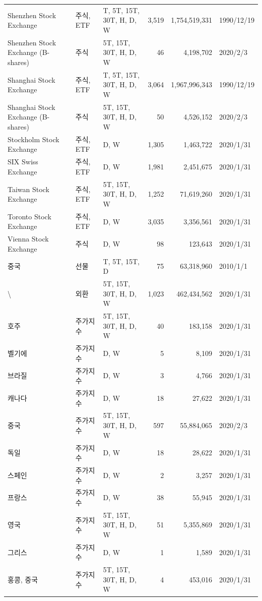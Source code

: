 \begin{footnotesize}
\begin{center}
\begin{longtable}{@{\extracolsep{\fill}} l l l r r l @{}}
        Shenzhen Stock Exchange & 주식, ETF & T, 5T, 15T, 30T, H, D, W & 3,519 & 1,754,519,331 & 1990/12/19 \\
        Shenzhen Stock Exchange (B-shares) & 주식 & 5T, 15T, 30T, H, D, W & 46 & 4,198,702 & 2020/2/3 \\
        Shanghai Stock Exchange & 주식, ETF & T, 5T, 15T, 30T, H, D, W & 3,064 & 1,967,996,343 & 1990/12/19 \\
        Shanghai Stock Exchange (B-shares) & 주식 & 5T, 15T, 30T, H, D, W & 50 & 4,526,152 & 2020/2/3 \\
        Stockholm Stock Exchange & 주식, ETF & D, W  & 1,305 & 1,463,722 & 2020/1/31 \\
        SIX Swiss Exchange & 주식, ETF & D, W  & 1,981 & 2,451,675 & 2020/1/31 \\
        Taiwan Stock Exchange & 주식, ETF & 5T, 15T, 30T, H, D, W & 1,252 & 71,619,260 & 2020/1/31 \\
        Toronto Stock Exchange & 주식, ETF & D, W  & 3,035 & 3,356,561 & 2020/1/31 \\
        Vienna Stock Exchange & 주식 & D, W  & 98 & 123,643 & 2020/1/31 \\
        중국 & 선물 & T, 5T, 15T, D & 75 & 63,318,960 & 2010/1/1 \\
        \textbackslash & 외환 & 5T, 15T, 30T, H, D, W & 1,023 & 462,434,562 & 2020/1/31 \\
        호주 & 주가지수 & 5T, 15T, 30T, H, D, W & 40 & 183,158 & 2020/1/31 \\
        벨기에 & 주가지수 & D, W  & 5 & 8,109 & 2020/1/31 \\
        브라질 & 주가지수 & D, W  & 3 & 4,766 & 2020/1/31 \\
        캐나다 & 주가지수 & D, W  & 18 & 27,622 & 2020/1/31 \\
        중국 & 주가지수 & 5T, 15T, 30T, H, D, W & 597 & 55,884,065 & 2020/2/3 \\
        독일 & 주가지수 & D, W  & 18 & 28,622 & 2020/1/31 \\
        스페인 & 주가지수 & D, W  & 2 & 3,257 & 2020/1/31 \\
        프랑스 & 주가지수 & D, W  & 38 & 55,945 & 2020/1/31 \\
        영국 & 주가지수 & 5T, 15T, 30T, H, D, W   & 51 & 5,355,869  & 2020/1/31 \\
        그리스 & 주가지수 & D, W  & 1 & 1,589 & 2020/1/31 \\
        홍콩, 중국 & 주가지수 & 5T, 15T, 30T, H, D, W   & 4 & 453,016 & 2020/1/31 \\

\end{longtable}
\end{center}
\end{footnotesize}
